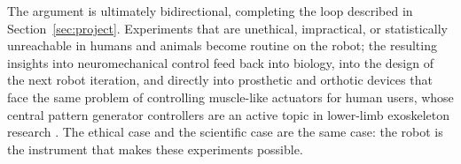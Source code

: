 The argument is ultimately bidirectional, completing the loop described in Section~\ref{sec:project}. Experiments that are unethical, impractical, or statistically unreachable in humans and animals become routine on the robot; the resulting insights into neuromechanical control feed back into biology, into the design of the next robot iteration, and directly into prosthetic and orthotic devices that face the same problem of controlling muscle-like actuators for human users, whose central pattern generator controllers are an active topic in lower-limb exoskeleton research \citep{duan_gait_2024, pery_benchmarking_2026}. The ethical case and the scientific case are the same case: the robot is the instrument that makes these experiments possible.
